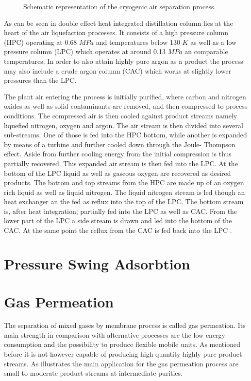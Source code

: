 \begin{figure}
	
	\caption[Air Separation Unit]{Schematic representation of the cryogenic air separation process.}
	\label{fig:ASU}
\end{figure}

As can be seen in  double effect heat integrated distillation column lies at the heart of the air 
liquefaction processes. It consists of a high pressure column (HPC) operating at 0.68 $MPa$ and 
temperatures below 130 $K$ as well as a low pressure column (LPC) which operates at around 0.13 
$MPa$ an comparable temperatures. In order to also attain highly pure argon as a product the process 
may also include a crude argon column (CAC) which works at slightly lower pressures than the LPC.

The plant air entering the process is initially purified, where carbon and nitrogen oxides as well as solid contaminants are removed, and then compressed to process conditions. The compressed air is then cooled 
against product streams namely liquefied nitrogen, oxygen and argon. The air stream is then divided into 
several sub-streams. One of those is fed into the HPC bottom, while another is expanded by means of a 
turbine and further cooled down through the Joule- Thompson effect. Aside from further cooling energy from 
the initial compression is thus partially recovered. This expanded air stream is then fed into the LPC. At the 
bottom of the LPC liquid as well as gaseous oxygen are recovered as desired products. The bottom and top 
streams from the HPC are made up of an oxygen rich liquid as well as liquid nitrogen. The liquid nitrogen 
stream is led though an heat exchanger an the fed as reflux into the top of the LPC. The bottom stream is, 
after heat integration, partially fed into the LPC as well as CAC. From the lower part of the LPC a side stream 
is drawn and led into the bottom of the CAC. At the same point the reflux from the CAC is fed back into the 
LPC \cite{Zhu.2010}.

\section{Pressure Swing Adsorbtion}
\label{sec:psa}

\section{Gas Permeation}
\label{sec:membrane}
The separation of mixed gases by membrane process is called gas permeation. Its main strength 
in comparison with alternative processes are the low energy consumption and the possibility to 
produce flexible mobile units. As mentioned before it is not however capable of producing high
quantity highly pure product streams. As  illustrates the main application 
for the gas permeation process are small to moderate product streams at intermediate purities.   


